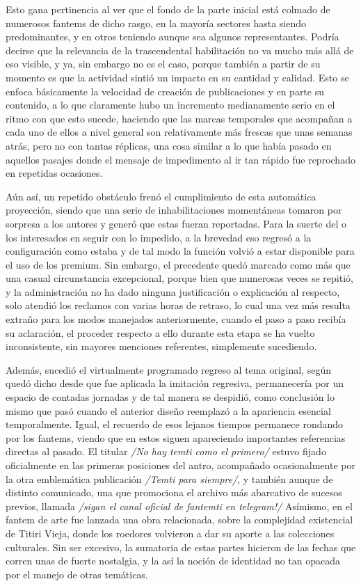 \documentclass[
]{book}
\begin{document}
Esto gana pertinencia al ver que el fondo de la parte inicial está colmado de numerosos fantems de dicho rasgo, en la mayoría sectores hasta siendo predominantes, y en otros teniendo aunque sea algunos representantes. Podría decirse que la relevancia de la trascendental habilitación no va mucho más allá de eso visible, y ya, sin embargo no es el caso, porque también a partir de su momento es que la actividad sintió un impacto en su cantidad y calidad. Esto se enfoca básicamente la velocidad de creación de publicaciones y en parte su contenido, a lo que claramente hubo un incremento medianamente serio en el ritmo con que esto sucede, haciendo que las marcas temporales que acompañan a cada uno de ellos a nivel general son relativamente más frescas que unas semanas atrás, pero no con tantas réplicas, una cosa similar a lo que había pasado en aquellos pasajes donde el mensaje de impedimento al ir tan rápido fue reprochado en repetidas ocasiones.

Aún así, un repetido obstáculo frenó el cumplimiento de esta automática proyección, siendo que una serie de inhabilitaciones momentáneas tomaron por sorpresa a los autores y generó que estas fueran reportadas. Para la suerte del o los interesados en seguir con lo impedido, a la brevedad eso regresó a la configuración como estaba y de tal modo la función volvió a estar disponible para el uso de los premium. Sin embargo, el precedente quedó marcado como más que una casual circunstancia excepcional, porque bien que numerosas veces se repitió, y la administración no ha dado ninguna justificación o explicación al respecto, solo atendió los reclamos con varias horas de retraso, lo cual una vez más resulta extraño para los modos manejados anteriormente, cuando el paso a paso recibía su aclaración, el proceder respecto a ello durante esta etapa se ha vuelto inconsistente, sin mayores menciones referentes, simplemente sucediendo.

Además, sucedió el virtualmente programado regreso al tema original, según quedó dicho desde que fue aplicada la imitación regresiva, permanecería por un espacio de contadas jornadas y de tal manera se despidió, como conclusión lo mismo que pasó cuando el anterior diseño reemplazó a la apariencia esencial temporalmente. Igual, el recuerdo de esos lejanos tiempos permanece rondando por los fantems, viendo que en estos siguen apareciendo importantes referencias directas al pasado. El titular \emph{/No hay temti como el primero/} estuvo fijado oficialmente en las primeras posiciones del antro, acompañado ocasionalmente por la otra emblemática publicación \emph{/Temti para siempre/}, y también aunque de distinto comunicado, una que promociona el archivo más abarcativo de sucesos previos, llamada \emph{/sigan el canal oficial de fantemti en telegram!/} Asímismo, en el fantem de arte fue lanzada una obra relacionada, sobre la complejidad existencial de Titiri Vieja, donde los roedores volvieron a dar su aporte a las colecciones culturales. Sin ser excesivo, la sumatoria de estas partes hicieron de las fechas que corren unas de fuerte nostalgia, y la así la noción de identidad no tan opacada por el manejo de otras temáticas.
\end{document}
